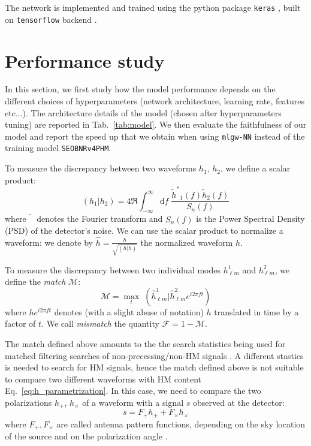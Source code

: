 \documentclass[twocolumn,showpacs,preprintnumbers,nofootinbib,prd,
superscriptaddress,10pt]{revtex4-1}
\newcommand{\rescalar}[2]{( #1 |#2 )}
\begin{document}
The network is implemented and trained using the python package \texttt{keras} \cite{chollet2015keras}, built on \texttt{tensorflow} backend \cite{tensorflow2015-whitepaper}.

\section{Performance study}
\label{sec:performance}
In this section, we first study how the model performance depends on the different choices of hyperparameters (network architecture, learning rate, features etc...).
The architecture details of the model (chosen after hyperparameters tuning) are reported in Tab.~\ref{tab:model}.
We then evaluate the faithfulness of our model and report the speed up that we obtain when using \texttt{mlgw-NN} instead of the training model \texttt{SEOBNRv4PHM}.

To measure the discrepancy between two waveforms  $h_1$, $h_2$, we define a scalar product:
\begin{equation}
	\rescalar{h_1}{h_2} = 4 \Re \int_{-\infty}^{\infty} \text{d}f \; \frac{{\tilde{h}^*}_1(f) \tilde{h}_2(f)}{S_n(f)}
\end{equation}
where $\tilde{\phantom{h}}$ denotes the Fourier transform and $S_n(f)$ is the Power Spectral Density (PSD) of the detector's noise.
We can use the scalar product to normalize a waveform: we denote by $\hat{h} = \frac{h}{\sqrt{\rescalar{h}{h}}}$ the normalized waveform $h$.

To measure the discrepancy between two individual modes $h^1_{\ell m}$ and $h^2_{\ell m}$, we define the {\it match} $\mathcal{M}$:
\begin{equation}\label{eq:match}
	\mathcal{M} = \max_t \; \rescalar{\hat{h}^1_{\ell m}}{\hat{h}^2_{\ell m} e^{i 2\pi ft}}
\end{equation}
where $h e^{i 2\pi ft}$ denotes (with a slight abuse of notation) $h$ translated in time by a factor of $t$.
We call {\it mismatch} the quantity $\mathcal{F} = 1 - \mathcal{M}$.

The match defined above amounts to the the search statistics being used for matched filtering searches of non-precessing/non-HM signals \cite{}.
A different stastics is needed to search for HM signals, hence the match defined above is not suitable to compare two different waveforms with HM content Eq.~\eqref{eq:h_parametrization}.
In this case, we need to compare the two polarizations $h_+$, $h_\times$ of a waveform with a signal $s$ observed at the detector:
\begin{equation}
	s = F_+ h_+ + F_\times h_\times
\end{equation}
where $F_+, F_\times$ are called antenna pattern functions, depending on the sky location of the source and on the polarization angle \cite{}.
\end{document}
